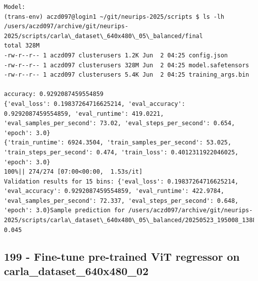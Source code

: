 \begin{verbatim}
Model:
(trans-env) aczd097@login1 ~/git/neurips-2025/scripts $ ls -lh /users/aczd097/archive/git/neurips-2025/scripts/carla\_dataset\_640x480\_05\_balanced/final
total 328M
-rw-r--r-- 1 aczd097 clusterusers 1.2K Jun  2 04:25 config.json
-rw-r--r-- 1 aczd097 clusterusers 328M Jun  2 04:25 model.safetensors
-rw-r--r-- 1 aczd097 clusterusers 5.4K Jun  2 04:25 training_args.bin

accuracy: 0.9292087459554859
{'eval_loss': 0.19837264716625214, 'eval_accuracy': 0.9292087459554859, 'eval_runtime': 419.0221, 'eval_samples_per_second': 73.02, 'eval_steps_per_second': 0.654, 'epoch': 3.0}
{'train_runtime': 6924.3504, 'train_samples_per_second': 53.025, 'train_steps_per_second': 0.474, 'train_loss': 0.4012311922046025, 'epoch': 3.0}
100%|| 274/274 [07:00<00:00,  1.53s/it]
Validation results for 15 bins: {'eval_loss': 0.19837264716625214, 'eval_accuracy': 0.9292087459554859, 'eval_runtime': 422.9784, 'eval_samples_per_second': 72.337, 'eval_steps_per_second': 0.648, 'epoch': 3.0}Sample prediction for /users/aczd097/archive/git/neurips-2025/scripts/carla\_dataset\_640x480\_05\_balanced/20250523_195008_138813_8381_steering_0.0450.jpg: 0.045
\end{verbatim}

\subsection{199 - Fine-tune pre-trained ViT regressor on carla\_dataset\_640x480\_02}
\label{app_res:199}

